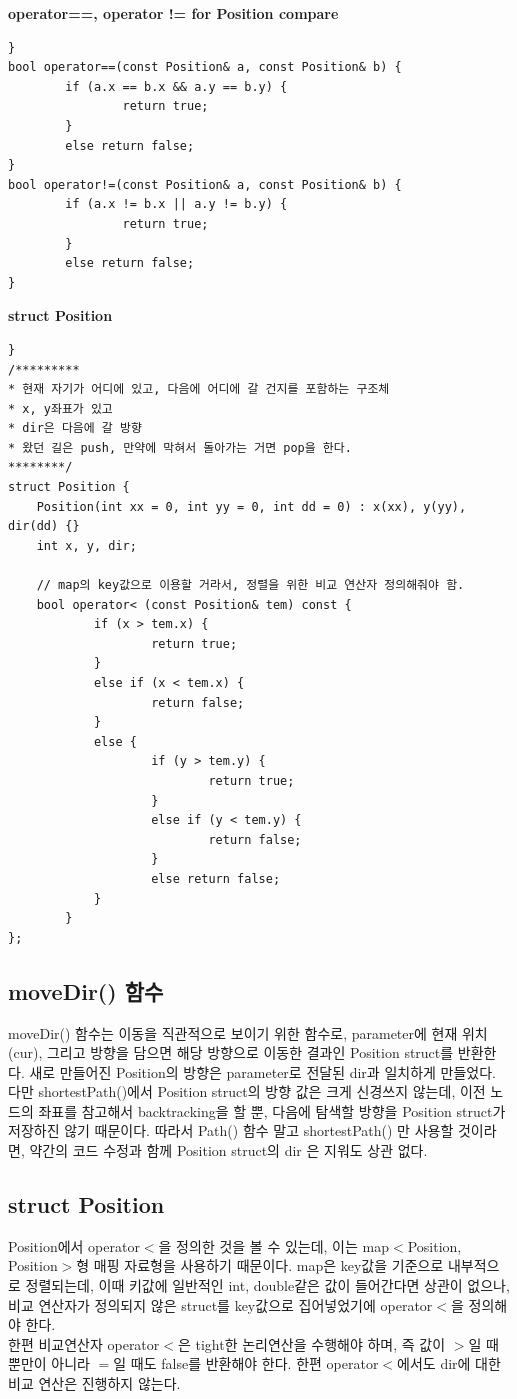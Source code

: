 \documentclass{article}
\begin{document}
\textbf{operator==, operator != for Position compare}
\begin{verbatim}}
bool operator==(const Position& a, const Position& b) {
    	if (a.x == b.x && a.y == b.y) {
        		return true;
    	}
    	else return false;
}
bool operator!=(const Position& a, const Position& b) {
    	if (a.x != b.x || a.y != b.y) {
        		return true;
    	}
    	else return false;
}
\end{verbatim}

\textbf{struct Position}
\begin{verbatim}}
/*********
* 현재 자기가 어디에 있고, 다음에 어디에 갈 건지를 포함하는 구조체
* x, y좌표가 있고
* dir은 다음에 갈 방향
* 왔던 길은 push, 만약에 막혀서 돌아가는 거면 pop을 한다.
********/
struct Position {
	Position(int xx = 0, int yy = 0, int dd = 0) : x(xx), y(yy), dir(dd) {}
	int x, y, dir;

	// map의 key값으로 이용할 거라서, 정렬을 위한 비교 연산자 정의해줘야 함.
	bool operator< (const Position& tem) const {
    		if (x > tem.x) {
        			return true;
    		}
    		else if (x < tem.x) {
        			return false;
    		}
    		else {
        			if (y > tem.y) {
            				return true;
        			}
        			else if (y < tem.y) {
            				return false;
        			}
        			else return false;
    		}
    	}
};
\end{verbatim}
\subsection{moveDir() 함수}
moveDir() 함수는 이동을 직관적으로 보이기 위한 함수로, parameter에 현재 위치(cur), 그리고 방향을 담으면 해당 방향으로 이동한 결과인 Position struct를 반환한다.
새로 만들어진 Position의 방향은 parameter로 전달된 dir과 일치하게 만들었다. 다만 shortestPath()에서 Position struct의 방향 값은 크게 신경쓰지 않는데, 이전 노드의 좌표를 참고해서 backtracking을 할 뿐, 다음에 탐색할 방향을 Position struct가 저장하진 않기 때문이다. 따라서 Path() 함수 말고 shortestPath() 만 사용할 것이라면, 약간의 코드 수정과 함께 Position struct의 dir 은 지워도 상관 없다.
\subsection{struct Position}
Position에서 operator$<$을 정의한 것을 볼 수 있는데, 이는 map$<$Position, Position$>$형 매핑 자료형을 사용하기 때문이다. map은 key값을 기준으로 내부적으로 정렬되는데, 이때 키값에 일반적인 int, double같은 값이 들어간다면 상관이 없으나, 비교 연산자가 정의되지 않은 struct를 key값으로 집어넣었기에 operator$<$을 정의해야 한다.\\
한편 비교연산자 operator$<$은 tight한 논리연산을 수행해야 하며, 즉 값이 $>$일 때 뿐만이 아니라 $=$일 때도 false를 반환해야 한다. 한편 operator$<$에서도 dir에 대한 비교 연산은 진행하지 않는다.
\end{document}
